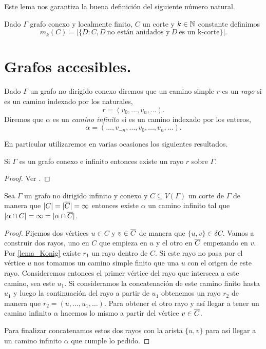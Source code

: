 \documentclass[tesis.tex]{subfiles}
\begin{document}
Este lema nos garantiza la buena definición del siguiente número natural.
\begin{deff}
	Dado $\Gamma$ grafo conexo y localmente finito, $C$ un corte y $k \in \mathbb{N}$ constante definimos
	\[
	m_k(C) = | \{  D : C, D \ \text{no están anidados y} \ D \ \text{es un k-corte}   \} |. 
	\]
\end{deff}



\section{Grafos accesibles.}

\begin{deff}
	Dado $\Gamma$ un grafo no dirigido conexo diremos que un camino simple $r$ es un \emph{rayo} si es un camino indexado por los naturales,
	\[
	r = (v_0, \dots, v_{n}, \dots).
	\]	
	Diremos que $\alpha$ es un \emph{camino infinito} si es un camino indexado por los enteros,
	\[
	\alpha = ( \dots, v_{-n}, \dots, v_0, \dots, v_{n}, \dots ).
	\]
\end{deff}		


En particular utilizaremos en varias ocasiones los siguientes resultados.


\begin{lema}[König]\label{lema_Konig}
	Si $\Gamma$ es un grafo conexo e infinito entonces existe un rayo $r$ sobre $\Gamma$.
\end{lema}
\begin{proof}
	Ver \cite[p.215]{diestel2005graph}.
\end{proof}


\begin{lema}\label{lema_camino_infinito_cortado}
	Sea $\Gamma$ un grafo no dirigido infinito y conexo y $C \subseteq V(\Gamma)$ un corte de $\Gamma$ de manera que $|C| = |\overline C| = \infty$ entonces existe $\alpha$ un camino infinito tal que 
	$|\alpha \cap C| = \infty = |\alpha \cap \overline C|$.
\end{lema}

\begin{proof}
	Fijemos dos vértices $u \in C$ y $v \in \overline C$ de manera que $\{u,v\} \in \delta C$.
	Vamos a construir dos rayos, uno en $C$ que empieza en $u$ y el otro en $\overline C$ empezando en $v$.
	Por \ref{lema_Konig} existe $r_{1}$ un rayo dentro de $C$.
	Si este rayo no pasa por el vértice $u$ nos tomamos un camino simple finito que una $u$ con el origen de este rayo.
	Consideremos entonces el primer vértice del rayo que interseca a este camino, sea este $u_{1}$.
	Si consideramos la concatenación de este camino finito hasta $u_{1}$ y luego la continuación del rayo a partir de $u_{1}$ obtenemos 
	un rayo $r_{2}$ de manera que $r_{2} = (u, \dots, u_{1}, \dots)$.
	Para obtener el otro rayo y así llegar a tener un camino infinito $\alpha$ hacemos lo mismo a partir del vértice $v \in \overline C$. 
	
	Para finalizar concatenamos estos dos rayos con la arista $\{u,v\}$ para así llegar a un camino infinito $\alpha$ que cumple lo pedido. 
	
\end{proof}
\end{document}
